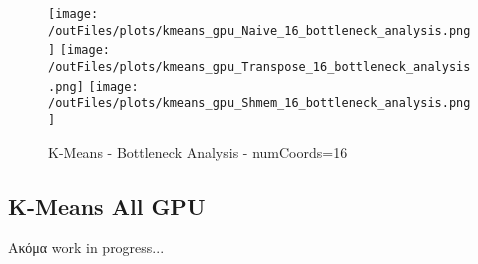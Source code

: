 \documentclass[../final_report.tex]{subfiles}
\begin{document}
\begin{figure}[H]
    \centering
    \texttt{[image: /outFiles/plots/kmeans\_gpu\_Naive\_16\_bottleneck\_analysis.png]}
    \texttt{[image: /outFiles/plots/kmeans\_gpu\_Transpose\_16\_bottleneck\_analysis.png]}
    \texttt{[image: /outFiles/plots/kmeans\_gpu\_Shmem\_16\_bottleneck\_analysis.png]}
    \caption{K-Means - Bottleneck Analysis - numCoords=16}
    \label{fig:K-Means - Bottleneck Analysis - numCoords=16}
\end{figure}

\subsection{K-Means All GPU}
Ακόμα work in progress...
\end{document}
